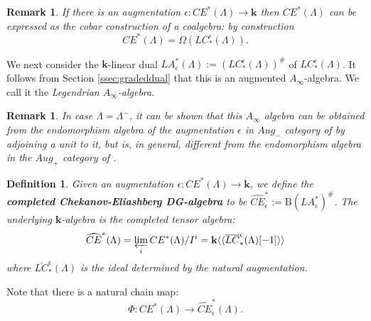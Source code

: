 \documentclass{gtpart}
\newtheorem{defi}[thm]{Definition}
\newtheorem{rem}[thm]{Remark}
\renewcommand{\k}{\mathbf{k}}
\renewcommand{\Bar}{\mathrm{B}}
\begin{document}
\begin{rem}
If there is an augmentation $\epsilon\colon CE^{\ast}(\Lambda)\to \k$ then $CE^{\ast}(\Lambda)$ can be expressed as the cobar construction of a coalgebra: by construction	
\[ 
CE^*(\Lambda) = \Omega(LC_*^\epsilon(\Lambda)). 
\] 
\end{rem}



We next consider the $\k$-linear dual $LA^*_\epsilon(\Lambda) :=
(LC_*^\epsilon(\Lambda))^\#$ of $LC_{\ast}^{\epsilon}(\Lambda)$. 
It follows from Section \ref{ssec:gradeddual} that this is an augmented $A_\infty$-algebra. We call it the \emph{Legendrian $A_\infty$-algebra}.

\begin{rem}
In case $\Lambda=\Lambda^{-}$, it can be shown that this $A_\infty$ algebra can be obtained
from the endomorphism algebra of the augmentation $\epsilon$ in $Aug_{-}$ category  of \cite{BC} by
adjoining a unit to it, but is, in general, different from the endomorphism algebra in the $Aug_{+}$
category of \cite{NRSSZ}.	
\end{rem}



\begin{defi} Given an augmentation $\epsilon\colon CE^*(\Lambda) \to \k$, we define the {\bf completed
		Chekanov-Eliashberg DG-algebra} to be $\widehat{CE}_\epsilon^*  := \Bar (LA_\epsilon^*)^{\#}$. The underlying $\k$-algebra is the completed tensor algebra:
	\[ \widehat{CE}^*(\Lambda) = \varprojlim_i CE^*(\Lambda)/I^{i} = \k \langle \langle \overline{LC}_{\ast}^{\epsilon}(\Lambda)[-1] \rangle \rangle \]
	where $\overline{LC}_{\ast}^{\epsilon}(\Lambda)$ is the ideal determined by the natural augmentation.  
\end{defi} 

Note that there is a natural chain map:
\[ \Phi \colon CE^*(\Lambda) \to \widehat{CE}^*_\epsilon(\Lambda). \] 


%
\end{document}
